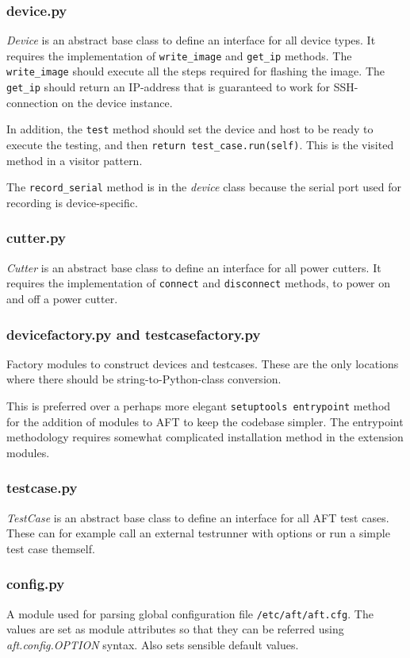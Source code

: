 \documentclass[a4paper,11pt]{article}
\newcommand{\cmd}[1]{\texttt{#1}}
\begin{document}
\subsubsection*{device.py}
\emph{Device} is an abstract base class to define an interface for all device types. It requires the implementation of \cmd{write\_image} and \cmd{get\_ip} methods. The \cmd{write\_image} should execute all the steps required for flashing the image. The \cmd{get\_ip} should return an IP-address that is guaranteed to work for SSH-connection on the device instance.

In addition, the \cmd{test} method should set the device and host to be ready to execute the testing, and then \cmd{return test\_case.run(self)}. This is the visited method in a visitor pattern.

The \cmd{record\_serial} method is in the \emph{device} class because the serial port used for recording is device-specific.

\subsubsection*{cutter.py}
\emph{Cutter} is an abstract base class to define an interface for all power cutters. It requires the implementation of \cmd{connect} and \cmd{disconnect} methods, to power on and off a power cutter.

\subsubsection*{devicefactory.py and testcasefactory.py}
Factory modules to construct devices and testcases. These are the only locations where there should be string-to-Python-class conversion.

This is preferred over a perhaps more elegant \cmd{setuptools entrypoint} method for the addition of modules to AFT to keep the codebase simpler. The entrypoint methodology requires somewhat complicated installation method in the extension modules.

\subsubsection*{testcase.py}
\emph{TestCase} is an abstract base class to define an interface for all AFT test cases. These can for example call an external testrunner with options or run a simple test case themself.

\subsubsection*{config.py}
A module used for parsing global configuration file \cmd{/etc/aft/aft.cfg}. The values are set as module attributes so that they can be referred using \emph{aft.config.OPTION} syntax. Also sets sensible default values.
\end{document}
